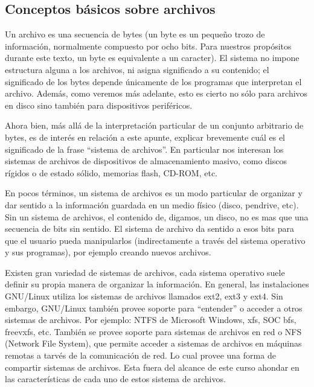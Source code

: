 \documentclass[12pt]{article}
\begin{document}
\subsection*{Conceptos básicos sobre archivos}
Un archivo es una secuencia de bytes (un byte es un pequeño trozo de 
información, normalmente compuesto por ocho bits. Para nuestros propósitos
durante este texto, un byte es equivalente a un caracter). El sistema no impone 
estructura alguna a los archivos, ni asigna significado a su contenido; el 
significado de los bytes depende únicamente de los programas que 
interpretan el archivo. Además, como veremos más adelante, esto es cierto no sólo 
para archivos en disco sino también para dispositivos periféricos. 

Ahora bien, más allá de la interpretación particular de un conjunto arbitrario de bytes, es 
de interés en relación a este apunte, explicar brevemente cuál es el significado de
la frase ``sistema de archivos''. En particular nos interesan los sistemas de 
archivos de dispositivos de almacenamiento masivo, como discos rígidos o de estado sólido, 
memorias flash, CD-ROM, etc. 

En pocos términos, un sistema de archivos es un modo particular de organizar y dar 
sentido a la información guardada en un medio físico (disco, pendrive, etc). Sin un sistema 
de archivos, el contenido de, digamos, un disco, no es mas que una secuencia de bits sin 
sentido. El sistema de archivo da sentido a esos bits para que el usuario pueda manipularlos  
(indirectamente a través del sistema operativo y sus programas), por ejemplo creando nuevos archivos. 

Existen gran variedad de sistemas de archivos, cada sistema operativo suele definir su 
propia manera de organizar la información. En general, las instalaciones GNU/Linux  
utiliza los sistemas de archivos llamados ext2, ext3 y ext4. Sin embargo, GNU/Linux también 
provee soporte para ``entender'' o acceder a otros sistemas de archivos. Por ejemplo: NTFS
de Microsoft Windows, xfs, SOC bfs, freevxfs, etc. También se provee soporte para sistemas
de archivos en red o NFS (Network File System), que permite acceder a sistemas de archivos
en máquinas remotas a tarvés de la comunicación de red. Lo cual provee una forma de 
compartir sistemas de archivos.  Esta fuera del alcance de este curso ahondar en las 
características de cada uno de estos sistema de archivos. 
\end{document}
